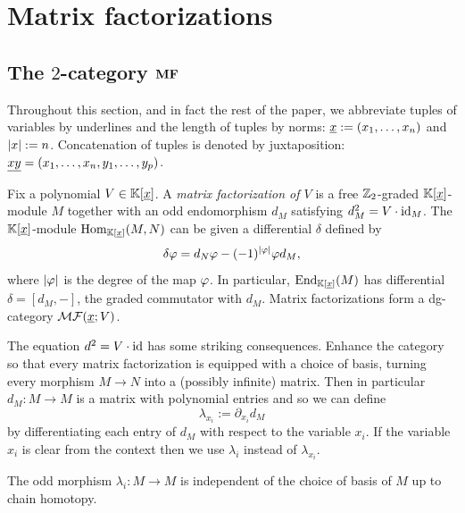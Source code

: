 \section{Matrix factorizations} \label{sec:matrix-fact}


\subsection{The $2$-category $\mathbf{MF}$} \label{sec:bMF}

Throughout this section, and in fact the rest of the paper, we abbreviate tuples of variables by underlines and the length of tuples by norms: $\underline{x} := (x_1, \dotsc, x_n)$ and $\left\lvert x \right\rvert := n$. Concatenation of tuples is denoted by juxtaposition: $\underline{xy} = (x_1, \dotsc, x_n, y_1, \dotsc, y_p)$.

Fix a polynomial $V \in \mathbb{K}[\underline{x}]$. A \emph{matrix factorization of $V$} is a free $\mathbb{Z}_2$-graded $\mathbb{K}[\underline{x}]$-module $M$ together with an odd endomorphism $d_M$ satisfying $d_M^2 = V \cdot \mathrm{id}_{M}$. The $\mathbb{K}[\underline{x}]$-module $\mathrm{Hom}_{\mathbb{K}[\underline{x}]}(M,N)$ can be given a differential $\delta$ defined by
\begin{equation*}
	\delta \varphi = d_N \varphi - (-1)^{\left\lvert \varphi \right\rvert} \varphi d_M,
\end{equation*}
where $\left\lvert \varphi \right\rvert$ is the degree of the map $\varphi$. In particular, $\mathrm{End}_{\mathbb{K}[\underline{x}]}(M)$ has differential $\delta = [d_M, -]$, the graded commutator with $d_M$. Matrix factorizations form a dg-category $\mathcal{MF}(\underline{x};V)$.

The equation $d^2 = V \cdot \mathrm{id}$ has some striking consequences. Enhance the category so that every matrix factorization is equipped with a choice of basis, turning every morphism $M \to N$ into a (possibly infinite) matrix. Then in particular $d_M : M \to M$ is a matrix with polynomial entries and so we can define
\begin{equation*}
	\lambda_{x_i} := \partial_{x_i} d_M	
\end{equation*}
by differentiating each entry of $d_M$ with respect to the variable $x_i$. If the variable $x_i$ is clear from the context then we use $\lambda_i$ instead of $\lambda_{x_i}$.

\begin{lmm} \label{lmm:derivative-of-dm}
	The odd morphism $\lambda_{i} : M \to M$ is independent of the choice of basis of $M$ up to chain homotopy.
\end{lmm}


